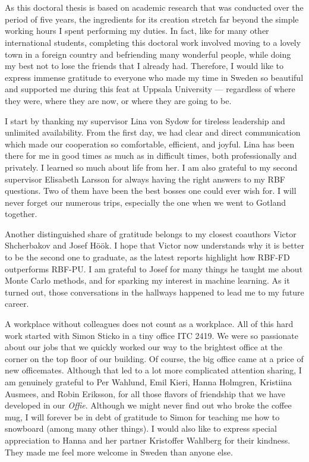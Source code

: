\documentclass{UUThesisTemplate}
\begin{document}
\chapter{{}}
{\noteunic
\par
As this doctoral thesis is based on academic research that was conducted over the period of five years, the ingredients for its creation stretch far beyond the simple working hours I spent performing my duties. In fact, like for many other international students, completing this doctoral work involved moving to a lovely town in a foreign country and befriending many wonderful people, while doing my best not to lose the friends that I already had. Therefore, I would like to express immense gratitude to everyone who made my time in Sweden so beautiful and supported me during this feat at Uppsala University --- regardless of where they were, where they are now, or where they are going to be.

\par
I start by thanking my supervisor Lina von Sydow for tireless leadership and unlimited availability. From the first day, we had clear and direct communication which made our cooperation so comfortable, efficient, and joyful. Lina has been there for me in good times as much as in difficult times, both professionally and privately. I learned so much about life from her. I am also grateful to my second supervisor Elisabeth Larsson for always having the right answers to my RBF questions. Two of them have been the best bosses one could ever wish for. I will never forget our numerous trips, especially the one when we went to Gotland together.

\par
Another distinguished share of gratitude belongs to my closest coauthors Victor Shcherbakov and Josef Höök. I hope that Victor now understands why it is better to be the second one to graduate, as the latest reports highlight how RBF-FD outperforms RBF-PU. I am grateful to Josef for many things he taught me about Monte Carlo methods, and for sparking my interest in machine learning. As it turned out, those conversations in the hallways happened to lead me to my future career. 

\par
A workplace without colleagues does not count as a workplace. All of this hard work started with Simon Sticko in a tiny office ITC 2419. We were so passionate about our jobs that we quickly worked our way to the brightest office at the corner on the top floor of our building. Of course, the big office came at a price of new officemates. Although that led to a lot more complicated attention sharing, I am genuinely grateful to Per Wahlund, Emil Kieri, Hanna Holmgren, Kristiina Ausmees, and Robin Eriksson, for all those flavors of friendship that we have developed in our \emph{Offie}. Although we might never find out who broke the coffee mug, I will forever be in debt of gratitude to Simon for teaching me how to snowboard (among many other things). I would also like to express special appreciation to Hanna and her partner Kristoffer Wahlberg for their kindness. They made me feel more welcome in Sweden than anyone else. 

}
\end{document}
